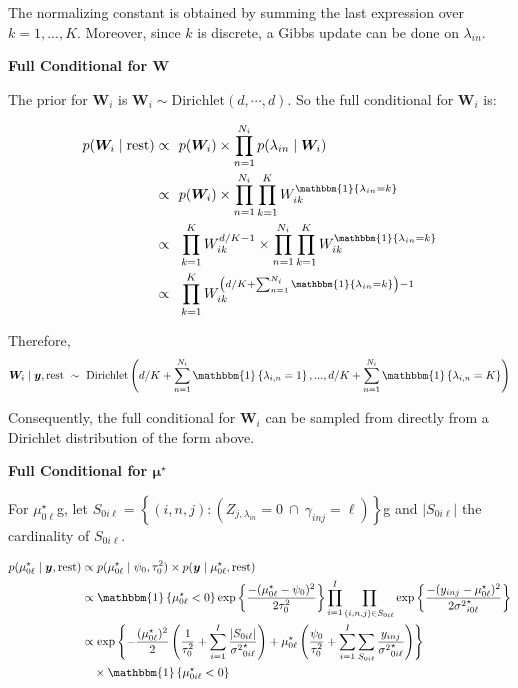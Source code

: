 \documentclass[12pt,]{article}
\newcommand{\p}[1]{\left(#1\right)}
\newcommand{\bc}[1]{ \left\{#1\right\} }
\def\Dir{\text{Dirichlet}}
\def\lin{\lambda_{in}}
\def\y{\bm{y}}
\def\mus{\mu^\star}
\newcommand{\Ind}[1]{\mathbbm{1}\bc{#1}}
\def\rest{\text{rest}}
\begin{document}
The normalizing constant is obtained by summing the last expression over
\(k = 1,...,K\). Moreover, since \(k\) is discrete, a Gibbs update can
be done on \(\lin\).

\textbf{Full Conditional for $\bm W$}

The prior for \(\bm{W}_i\) is \(\bm W_i \sim \Dir(d, \cdots, d)\). So
the full conditional for \(\bm{W}_i\) is:

\begin{align*}
p(\bm W_i \mid \rest) \propto&~~ p(\bm{W}_i) \times \prod_{n=1}^{N_i} p(\lin
  \mid \bm{W}_i)\\
\propto&~~ p(\bm{W}_i) \times \prod_{n=1}^{N_i}\prod_{k=1}^K
  W_{ik}^{\Ind{\lin=k}}\\
\propto&~~ \prod_{k=1}^K W_{ik}^{d/K-1} \times \prod_{n=1}^{N_i}\prod_{k=1}^K
  W_{ik}^{\Ind{\lin=k}}\\
\propto&~~ \prod_{k=1}^K W_{ik}^{\p{d/K + \sum_{n=1}^{N_i}\Ind{\lin=k}}-1}\\
%
\end{align*}

Therefore, \[
\bm{W}_i \mid \y,\rest ~\sim~
\Dir\p{d/K+\sum_{n=1}^{N_i}\Ind{\lambda_{i,n}=1},...,d/K+\sum_{n=1}^{N_i}\Ind{\lambda_{i,n}=K}} 
\]

Consequently, the full conditional for \(\bm{W}_i\) can be sampled from
directly from a Dirichlet distribution of the form above.
\vspace{2em}


\textbf{Full Conditional for $\bm\mu^\star$}

For \(\mus_{0\ell}\)g, let \(S_{0i\ell} = \bc{(i,n,j) : \p{Z_{j,\lin} = 0
~\cap~ \gamma_{inj} = \ell}}\)g and \(|S_{0i\ell}|\) the cardinality of
\(S_{0i\ell}\).

\newcommand\musZeroPostvarDenom{
  \frac{1}{\tau^2_0} +
  \sum_{i=1}^I\frac{|S_{0i\ell}|}{{\sigma^2}^\star_{0i\ell}}
}
\newcommand\musZeroPostMeanNum{
  \frac{\psi_0}{\tau^2_0} + 
  \sum_{i=1}^I \sum_{S_{0i\ell}}  
  \frac{y_{inj}}{{\sigma^2}^\star_{0i\ell}}
}

\begin{align*}
p(\mus_{0\ell} \mid \y, \rest) &\propto 
p(\mus_{0\ell} \mid \psi_0, \tau^2_0) \times p(\y \mid \mus_{0\ell},\rest) \\
%
&\propto
\Ind{\mus_{0\ell}<0} \exp\bc{\frac{-(\mus_{0\ell} - \psi_0)^2}{2\tau^2_{0}}}
\prod_{i=1}^I\prod_{(i,n,j)\in S_{0i\ell}} \exp\bc{\frac{-(y_{inj} -
\mus_{0\ell})^2}{2{\sigma^2}^\star_{i0\ell}}} \\
%
&\propto
\exp\bc{
  -\frac{(\mus_{0\ell})^2}{2}\p{\musZeroPostvarDenom} + 
  \mus_{0\ell}\p{\musZeroPostMeanNum}
} \\ 
& ~~~ \times \Ind{\mus_{0i\ell}<0} \\
\end{align*}
\end{document}
